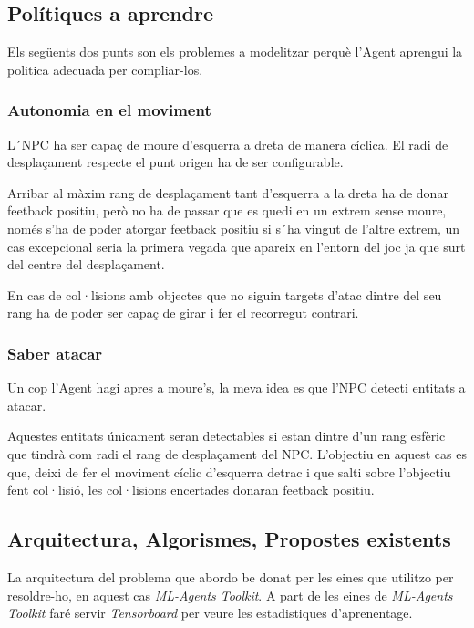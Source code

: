 \documentclass{article}
\begin{document}
    \subsection{Polítiques a aprendre}
    Els següents dos punts son els problemes a modelitzar perquè l'Agent aprengui la politica adecuada per compliar-los.
    
    \subsubsection{Autonomia en el moviment}
    
    L´NPC ha ser capaç de moure d’esquerra a dreta de manera cíclica. El radi de desplaçament respecte el punt origen ha de ser configurable.
    
    Arribar al màxim rang de desplaçament tant d’esquerra a la dreta ha de donar feetback positiu, però no ha de passar que es quedi en un extrem sense moure, només s’ha de poder atorgar feetback positiu si s´ha vingut de l’altre extrem, un cas excepcional seria la primera vegada que apareix en l’entorn del joc ja que surt del centre del desplaçament.
    
    En cas de col·lisions amb objectes que no siguin targets d'atac dintre del seu rang ha de poder ser capaç de girar i fer el recorregut contrari.
    
    \subsubsection{Saber atacar}
    
    Un cop l'Agent hagi apres a moure's, la meva idea es que l’NPC detecti entitats a atacar.
    
    Aquestes entitats únicament seran detectables si estan dintre d’un rang esfèric que tindrà com radi el rang de desplaçament del NPC. L’objectiu en aquest cas es que, deixi de fer el moviment cíclic d’esquerra detrac i que salti sobre l’objectiu fent col·lisió, les col·lisions encertades donaran feetback positiu.
    
    \newpage
    
    \subsection{Arquitectura, Algorismes, Propostes existents}
    
    La arquitectura del problema que abordo be donat per les eines que utilitzo per resoldre-ho, en aquest cas \textit{ML-Agents Toolkit}. A part de les eines de \textit{ML-Agents Toolkit} faré servir \textit{Tensorboard} per veure les estadistiques d'aprenentage.
    
\end{document}
